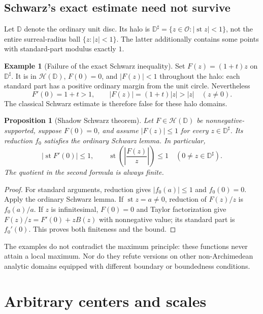 \documentclass[11pt,letterpaper]{article}
\numberwithin{equation}{section}
\newtheorem{proposition}[theorem]{Proposition}
\theoremstyle{definition}
\newtheorem{example}[theorem]{Example}
\theoremstyle{remark}
\newcommand{\OO}{\mathcal{O}}
\newcommand{\HH}{\mathcal{H}}
\newcommand{\st}{\operatorname{st}}
\begin{document}
\subsection{Schwarz's exact estimate need not survive}

Let $\mathbb D$ denote the ordinary unit disc. Its halo is
$\mathbb D^\sharp=\{z\in\OO:|\st z|<1\}$, not the entire surreal-radius
ball $\{z:|z|<1\}$. The latter additionally contains some points with
standard-part modulus exactly $1$.

\begin{example}[Failure of the exact Schwarz inequality]\label{ex:schwarz}
Set $F(z)=(1+t)z$ on $\mathbb D^\sharp$. It is in $\HH(\mathbb D)$,
$F(0)=0$, and $|F(z)|<1$ throughout the halo: each standard part has a
positive ordinary margin from the unit circle. Nevertheless
\[
 F'(0)=1+t>1,\qquad |F(z)|=(1+t)|z|>|z|\quad(z\ne0).
\]
The classical Schwarz estimate is therefore false for these halo domains.
\end{example}

\begin{proposition}[Shadow Schwarz theorem]\label{prop:schwarz}
Let $F\in\HH(\mathbb D)$ be nonnegative-supported, suppose $F(0)=0$, and
assume $|F(z)|\le1$ for every $z\in\mathbb D^\sharp$. Its reduction $f_0$
satisfies the ordinary Schwarz lemma. In particular,
\[
 |\st F'(0)|\le1,
 \qquad \st\left(\left|\frac{F(z)}z\right|\right)\le1
 \quad(0\ne z\in\mathbb D^\sharp).
\]
The quotient in the second formula is always finite.
\end{proposition}
\begin{proof}
For standard arguments, reduction gives $|f_0(a)|\le1$ and $f_0(0)=0$.
Apply the ordinary Schwarz lemma. If $\st z=a\ne0$, reduction of $F(z)/z$
is $f_0(a)/a$. If $z$ is infinitesimal, $F(0)=0$ and Taylor factorization
give $F(z)/z=F'(0)+zB(z)$ with nonnegative value; its standard part is
$f_0'(0)$. This proves both finiteness and the bound.
\end{proof}

The examples do not contradict the maximum principle: these functions never
attain a local maximum. Nor do they refute versions on other non-Archimedean
analytic domains equipped with different boundary or boundedness conditions.

\section{Arbitrary centers and scales}\label{sec:charts}
\end{document}
